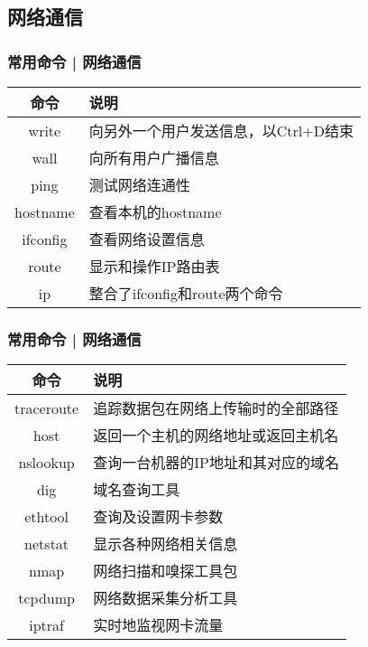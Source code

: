 \subsection{网络通信}
\begin{frame}
  \frametitle{常用命令 | 网络通信}
  \begin{table}
    \centering
    \begin{tabularx}{0.8\textwidth}{cX}
      \hline
      \rowcolor{blue!50}命令 & 说明\\
      \hline
      write & 向另外一个用户发送信息，以Ctrl+D结束\\
      wall & 向所有用户广播信息\\
      ping & 测试网络连通性\\
      hostname & 查看本机的hostname\\
      ifconfig & 查看网络设置信息\\
      route & 显示和操作IP路由表\\
      ip & 整合了ifconfig和route两个命令\\
      \hline
    \end{tabularx}
  \end{table}
\end{frame}

\begin{frame}
  \frametitle{常用命令 | 网络通信}
  \begin{table}
    \centering
    \begin{tabularx}{0.8\textwidth}{cX}
      \hline
      \rowcolor{blue!50}命令 & 说明\\
      \hline
      traceroute & 追踪数据包在网络上传输时的全部路径\\
      host & 返回一个主机的网络地址或返回主机名\\
      nslookup & 查询一台机器的IP地址和其对应的域名\\
      dig & 域名查询工具\\
      ethtool & 查询及设置网卡参数\\
      netstat & 显示各种网络相关信息\\
      nmap & 网络扫描和嗅探工具包\\
      tcpdump & 网络数据采集分析工具\\
      iptraf & 实时地监视网卡流量\\
      \hline
    \end{tabularx}
  \end{table}
\end{frame}

